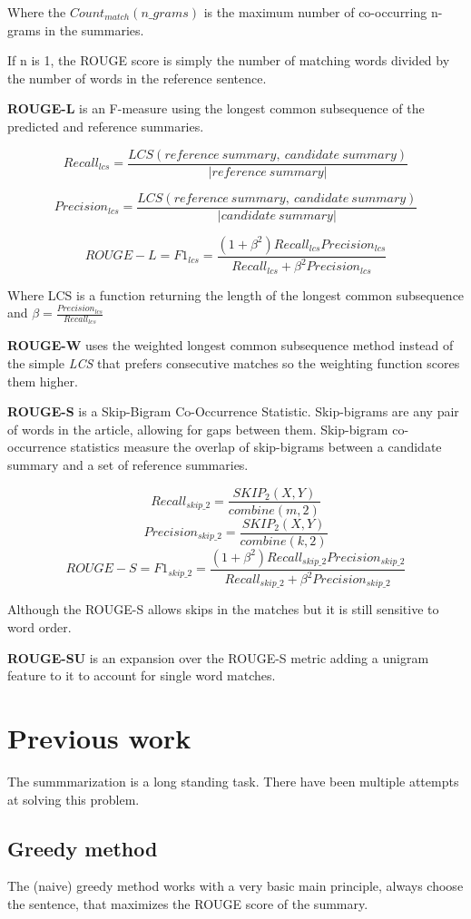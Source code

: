 Where the \(Count_{match}(n\_grams)\) is the maximum number of co-occurring n-grams in the summaries.

If n is 1, the ROUGE score is simply the number of matching words divided by the number of words in the reference sentence.

\textbf{ROUGE-L} is an F-measure using the longest common subsequence of the predicted and reference summaries.

\[Recall_{lcs} = \frac{LCS(reference\ summary,\ candidate\ summary)}{|reference\ summary|}\]

\[Precision_{lcs} = \frac{LCS(reference\ summary,\ candidate\ summary)}{|candidate\ summary|}\]

\[ROUGE-L = F1_{lcs} = \frac{(1 + \beta^2)Recall_{lcs}Precision_{lcs}}{Recall_{lcs} + \beta^2Precision_{lcs}}\]

Where LCS is a function returning the length of the longest common subsequence and \(\beta = \frac{Precision_{lcs}}{Recall_{lcs}}\)

\textbf{ROUGE-W} uses the weighted longest common subsequence method instead of the simple \textit{LCS} that prefers consecutive matches so the weighting function scores them higher.

\textbf{ROUGE-S} is a Skip-Bigram Co-Occurrence Statistic. Skip-bigrams are any pair of words in the article, allowing for gaps between them. Skip-bigram co-occurrence statistics measure the overlap of skip-bigrams between a candidate summary and a set of reference summaries.

\[Recall_{skip\_2} = \frac{SKIP_2(X, Y)}{combine(m, 2)}\]
\[Precision_{skip\_2} = \frac{SKIP_2(X, Y)}{combine(k, 2)}\]
\[ROUGE-S = F1_{skip\_2} = \frac{(1 + \beta^2)Recall_{skip\_2}Precision_{skip\_2}}{Recall_{skip\_2} + \beta^2Precision_{skip\_2}}\]

Although the ROUGE-S allows skips in the matches but it is still sensitive to word order.

\textbf{ROUGE-SU} is an expansion over the ROUGE-S metric adding a unigram feature to it to account for single word matches.

\section{Previous work}
The summmarization is a long standing task. There have been multiple attempts at solving this problem.

\subsection{Greedy method}
The (naive) greedy method works with a very basic main principle, always choose the sentence, that maximizes the ROUGE score of the summary.

